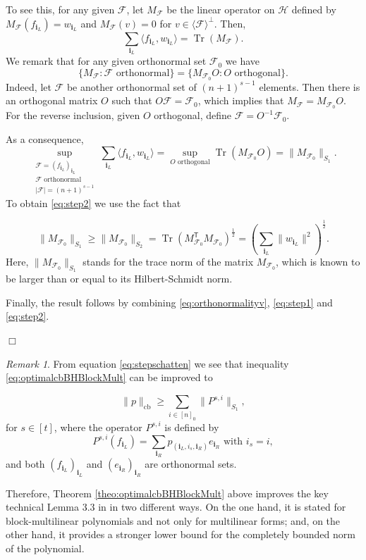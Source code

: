 \documentclass[11pt]{article}
\DeclareMathOperator{\cb}{cb}
\newcommand{\1}{\mathbf{1}}
\DeclareMathOperator{\Tr}{Tr}
\newcommand{\ind}[1]{\mathbf{#1}}
\theoremstyle{plain}
\theoremstyle{definition}
\theoremstyle{remark}
\newtheorem{remark}[theorem]{Remark}
\renewenvironment{proof}[1][]{
    	\begin{trivlist}
     	\item[\hspace{\labelsep}{\em\noindent Proof#1:\/}]}
     	{{\hfill$\Box$}
    	\end{trivlist}
  }
\begin{document}
\begin{proof}
To see this, for any given $\mathcal{F}$, let $M_{\mathcal{F}}$ be the linear operator on $\mathcal{H}$ defined by $M_{\mathcal{F}}(f_{{\ind{i}_L}})={w_{{\ind{i}_L}}}$ and $M_{\mathcal{F}}(v)=0$ for $v\in \langle \mathcal{F} \rangle ^\perp$. Then,
$$ \sum_{{\ind{i}_L}} \langle f_{{\ind{i}_L}}, w_{{\ind{i}_L}}\rangle =\Tr(M_{\mathcal{F}}).$$
We remark that for any given orthonormal set $\mathcal{F}_0$ we have
$$\{ M_{\mathcal{F}}: \mathcal{F} \mbox{ orthonormal}\}= \{ M_{\mathcal{F}_0} O: O \mbox{ orthogonal}\}.$$ Indeed, let $\mathcal{F}$ be another orthonormal set of $(n+1)^{s-1}$ elements. Then there is an orthogonal matrix $O$ such that $O \mathcal{F}= {\mathcal{F}_0}$, which implies that $M_{\mathcal{F}}=M_{\mathcal{F}_0} O.$ For the reverse inclusion, given $O$ orthogonal, define $\mathcal{F}=O^{-1}\mathcal{F}_0.$




As a consequence, $$ \sup _{\substack{\mathcal{F}=(f_{{\ind{i}_L}})_{{\ind{i}_L}}\\\mathcal{F}\text{ orthonormal}\\|\mathcal{F}|=(n+1)^{s-1}}} \sum_{{\ind{i}_L}} \langle f_{{\ind{i}_L}}, w_{{\ind{i}_L}}\rangle= \sup_{O \mbox{ orthogonal}} \Tr(M_{\mathcal{F}_0}O)=\|M_{\mathcal{F}_0}\|_{S_1}.$$ 
To obtain \eqref{eq:step2} we use the fact that 



    \begin{equation}
    \label{eq:stepschatten}
        \|M_{\mathcal{F}_0}\|_{S_1} \geq \|M_{\mathcal{F}_0}\|_{S_2} =  \Tr( M_{\mathcal{F}_0}^{\mathsf T} M_{\mathcal{F}_0})^\frac12= \left(\sum_{{\ind{i}_L}} \|w_{{\ind{i}_L}}\|^2\right)^\frac12.
    \end{equation} Here, $\|M_{\mathcal{F}_0}\|_{S_1}$ stands for the trace norm of the matrix $M_{\mathcal{F}_0}$, which is known to be larger than or equal to its Hilbert-Schmidt norm.
    
Finally, the result follows by combining \eqref{eq:orthonormalityv}, \eqref{eq:step1} and \eqref{eq:step2}.


\end{proof}
\begin{remark}
   From equation \eqref{eq:stepschatten} we see that 
   inequality \eqref{eq:optimalcbBHBlockMult} can be improved to

   $$\|p\|_{\cb} \geq \sum_{i\in [n]_0} \|P^{s,i}\|_{S_1},$$
   for $s\in[t]$, where the operator $P^{s,i}$ is defined by
   $$P^{s,i}(f_{{\ind{i}_L}})=\sum_{{\ind{i}_R}} p_{({\ind{i}_L},i_s,{\ind{i}_R})} e_{{\ind{i}_R}} \mbox{ with } i_s=i,$$ and both $(f_{{\ind{i}_L}})_{{\ind{i}_L}}$ and $(e_{{\ind{i}_R}})_{{\ind{i}_R}}$ are orthonormal sets.

   Therefore, Theorem \ref{theo:optimalcbBHBlockMult} above improves the key technical Lemma 3.3 in \cite{arunachalam2025cb} in two different ways. On the one hand, it is stated for block-multilinear polynomials and not only for multilinear forms; and, on the other hand, it provides a stronger lower bound for the completely bounded norm of the polynomial.
\end{remark}
\end{document}
